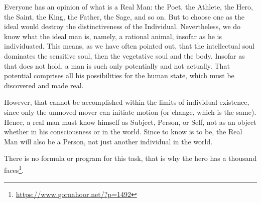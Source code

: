 Everyone has an opinion of what is a Real Man: the Poet, the Athlete, the Hero, the Saint, the King, the Father, the Sage, and so on. But to choose one as the ideal would destroy the distinctiveness of the Individual. Nevertheless, we do know what the ideal man is, namely, a rational animal, insofar as he is individuated. This means, as we have often pointed out, that the intellectual soul dominates the sensitive soul, then the vegetative soul and the body. Insofar as that does not hold, a man is such only potentially and not actually. That potential comprises all his possibilities for the human state, which must be discovered and made real.

However, that cannot be accomplished within the limits of individual existence, since only the unmoved mover can initiate motion (or change, which is the same). Hence, a real man must know himself as Subject, Person, or Self, not as an object whether in his consciousness or in the world. Since to know is to be, the Real Man will also be a Person, not just another individual in the world.

There is no formula or program for this task, that is why the hero has a thousand faces\footnote{\url{https://www.gornahoor.net/?p=1492}}.

